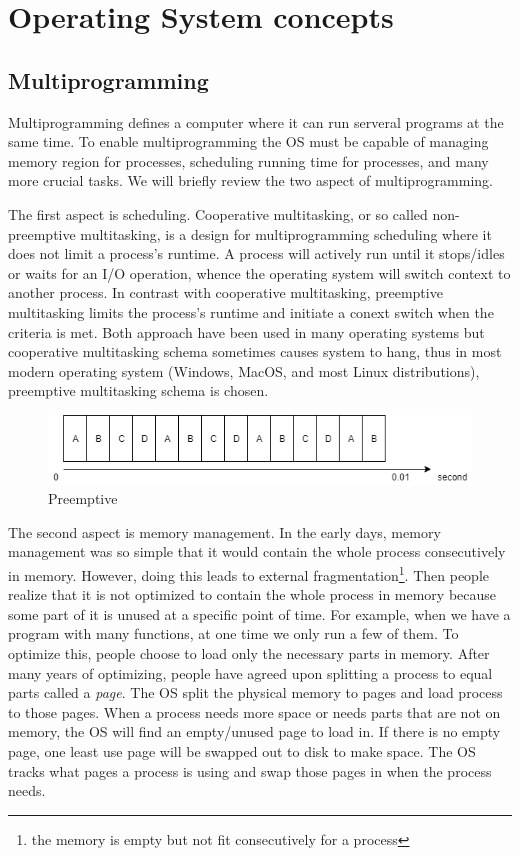\section[Operating System concepts]{Operating System concepts}

\subsection[Multiprogramming]{Multiprogramming}

Multiprogramming defines a computer where it can run serveral programs at the same time. To enable multiprogramming the OS must be capable of managing memory region for processes, scheduling running time for processes, and many more crucial tasks. We will briefly review the two aspect of multiprogramming.

The first aspect is scheduling. Cooperative multitasking, or so called non-preemptive multitasking, is a design for multiprogramming scheduling where it does not limit a process's runtime. A process will actively run until it stops/idles or waits for an I/O operation, whence the operating system will switch context to another process. In contrast with cooperative multitasking, preemptive multitasking limits the process's runtime and initiate a conext switch when the criteria is met. Both approach have been used in many operating systems but cooperative multitasking schema sometimes causes system to hang, thus in most modern operating system (Windows, MacOS, and most Linux distributions), preemptive multitasking schema is chosen.

\begin{figure}
  \centering
  \caption{Preemptive}
  \includegraphics[scale=0.8]{images/preemptive.png}
\end{figure}

The second aspect is memory management. In the early days, memory management was so simple that it would contain the whole process consecutively in memory. However, doing this leads to external fragmentation\footnote{the memory is empty but not fit consecutively for a process}. Then people realize that it is not optimized to contain the whole process in memory because some part of it is unused at a specific point of time. For example, when we have a program with many functions, at one time we only run a few of them. To optimize this, people choose to load only the necessary parts in memory. After many years of optimizing, people have agreed upon splitting a process to equal parts called a \textit{page}. The OS split the physical memory to pages and load process to those pages. When a process needs more space or needs parts that are not on memory, the OS will find an empty/unused page to load in. If there is no empty page, one least use page will be swapped out to disk to make space. The OS tracks what pages a process is using and swap those pages in when the process needs.


